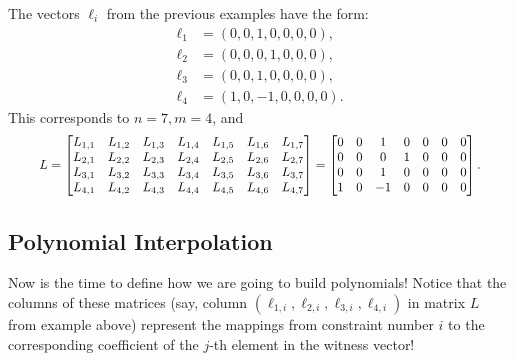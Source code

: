 \documentclass[../../book.tex]{subfiles}
\begin{document}
\begin{example}
    The vectors $\boldsymbol{\ell}_i$ from the previous examples have the form:
    \begin{align*}
        \boldsymbol{\ell}_1 &= (0, 0, 1, 0, 0, 0, 0), \\
        \boldsymbol{\ell}_2 &= (0, 0, 0, 1, 0, 0, 0), \\
        \boldsymbol{\ell}_3 &= (0, 0, 1, 0, 0, 0, 0), \\
        \boldsymbol{\ell}_4 &= (1, 0, -1, 0, 0, 0, 0).
    \end{align*}
    This corresponds to $n = 7, m = 4$, and
    \begin{equation*}
        \scalebox{0.9}{$
        L = \begin{bmatrix}
            L_{1,1} & L_{1,2} & L_{1,3} & L_{1,4} & L_{1,5} & L_{1,6} & L_{1,7} \\
            L_{2,1} & L_{2,2} & L_{2,3} & L_{2,4} & L_{2,5} & L_{2,6} & L_{2,7} \\
            L_{3,1} & L_{3,2} & L_{3,3} & L_{3,4} & L_{3,5} & L_{3,6} & L_{3,7} \\
            L_{4,1} & L_{4,2} & L_{4,3} & L_{4,4} & L_{4,5} & L_{4,6} & L_{4,7}
        \end{bmatrix} = \begin{bmatrix}
            0 & 0 & 1 & 0 & 0 & 0 & 0 \\
            0 & 0 & 0 & 1 & 0 & 0 & 0 \\
            0 & 0 & 1 & 0 & 0 & 0 & 0 \\
            1 & 0 & -1 & 0 & 0 & 0 & 0 
        \end{bmatrix}.
        $}
    \end{equation*}
\end{example}

\subsection{Polynomial Interpolation}

Now is the time to define how we are going to build polynomials! Notice that the
columns of these matrices (say, column $(\ell_{1,i},\ell_{2,i},\ell_{3,i},\ell_{4,i})$ in
matrix $L$ from example above) represent the mappings from constraint number $i$
to the corresponding coefficient of the $j$-th element in the witness vector!
\end{document}
